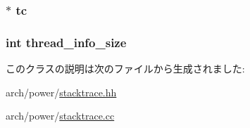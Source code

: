 \label{classPowerISA_1_1ProcessInfo_a6bca839d8255baba5c53a5eace70d72e}
\hypertarget{classPowerISA_1_1ProcessInfo_a4455a4759e69e5ebe68ae7298cbcc37d}{
\subsubsection[{tc}]{$\ast$ {\bf tc}}}
\label{classPowerISA_1_1ProcessInfo_a4455a4759e69e5ebe68ae7298cbcc37d}
\hypertarget{classPowerISA_1_1ProcessInfo_aa02520c2e86b94388e0d4f4a7b0873b3}{
\subsubsection[{thread\_\-info\_\-size}]{\setlength{\rightskip}{0pt plus 5cm}int {\bf thread\_\-info\_\-size}}}
\label{classPowerISA_1_1ProcessInfo_aa02520c2e86b94388e0d4f4a7b0873b3}


このクラスの説明は次のファイルから生成されました:\begin{DoxyCompactItemize}
\item 
arch/power/\hyperlink{power_2stacktrace_8hh}{stacktrace.hh}\item 
arch/power/\hyperlink{power_2stacktrace_8cc}{stacktrace.cc}\end{DoxyCompactItemize}
